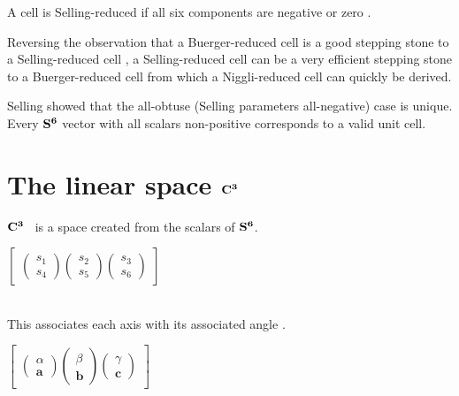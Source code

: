 \documentclass[preprint]{iucr}              %
\numberwithin{equation}{section}
\newcommand{\SVI}[0]{$\bf{S^{6}}$}
\newcommand{\CIII}[0]{$\bf{C^{3}}$}
\begin{document}
		 		{ A cell is Selling-reduced if all six components are negative or zero \cite{Delaunay1932}.  
			\item Reversing the  observation that a Buerger-reduced cell is a good stepping stone to a Selling-reduced cell \cite{Allmann1968},
			a Selling-reduced cell can be a very efficient stepping stone to a Buerger-reduced cell from which a Niggli-reduced cell can quickly be derived.
			\item {Selling showed that the all-obtuse (Selling parameters all-negative) case is unique.
			 Every \SVI{} vector with all scalars non-positive corresponds to a valid unit cell.}









\section{The linear space \CIII{}}
\label{C3}


	\CIII{}~ is a space created from the scalars of \SVI{}. \\
		\vspace{.1cm}
	
\begin{center}
		$\begin{bmatrix}
		\begin{pmatrix}
			s_1 \\
			s_4
		\end{pmatrix}
		\begin{pmatrix}
			s_2 \\
			s_5
		\end{pmatrix}
		\begin{pmatrix}
			s_3 \\
			s_6
		\end{pmatrix}
	\end{bmatrix}$\\
\end{center}	
    ~~\\
	This associates each axis with its associated angle \cite{Andrews2019b}. 
	~~\\
	
	\begin{center}
		$\begin{bmatrix}
			\begin{pmatrix}
				\alpha   \\
				\textbf{a}
			\end{pmatrix}
			\begin{pmatrix}
				\beta   \\
				\textbf{b}
			\end{pmatrix}
			\begin{pmatrix}
				\gamma   \\
				\textbf{c}
			\end{pmatrix}
		\end{bmatrix}$
	\end{center}			
	

}
\end{document}
